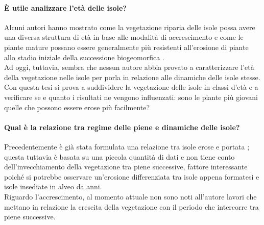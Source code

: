 \paragraph{È utile analizzare l'età delle isole?}
Alcuni autori hanno mostrato come la vegetazione riparia delle isole possa avere una diversa struttura di età in base alle modalità di accrescimento e come le piante mature possano essere generalmente più resistenti all'erosione di piante allo stadio iniziale della successione biogeomorfica .
\\
Ad oggi, tuttavia, sembra che nessun autore abbia provato a caratterizzare l'età della vegetazione nelle isole per porla in relazione alle dinamiche delle isole stesse.
\\
Con questa tesi si prova a suddividere la vegetazione delle isole in classi d'età e a verificare se e quanto i risultati ne vengono influenzati: sono le piante più giovani quelle che possono essere erose più facilmente?

\paragraph{Qual è la relazione tra regime delle piene e dinamiche delle isole?}
Precedentemente è già stata formulata una relazione tra isole erose e portata ;
questa tuttavia è basata su una piccola quantità di dati e non tiene conto dell'invecchiamento della vegetazione tra piene successive, fattore interessante poiché si potrebbe osservare un'erosione differenziata tra isole appena formatesi e isole insediate in alveo da anni.
\\
Riguardo l'accrescimento, al momento attuale non sono noti all'autore lavori che mettano in relazione la crescita della vegetazione con il periodo che intercorre tra piene successive.

